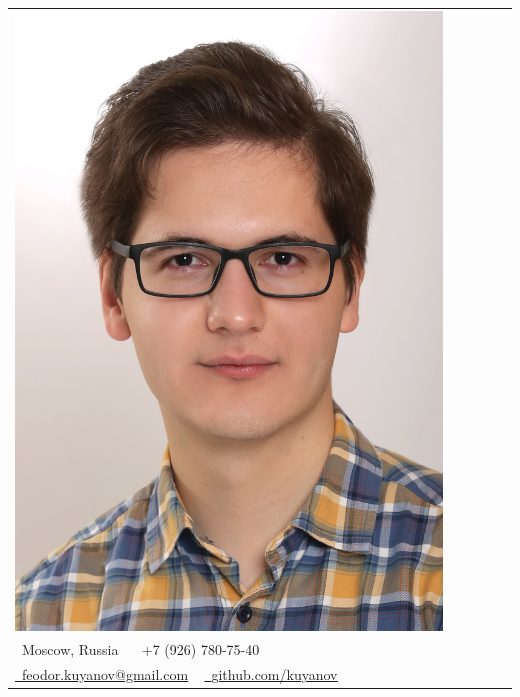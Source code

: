 \documentclass[letterpaper,11pt]{article}
\begin{document}
\begin{tabular}{l c}
	\begin{minipage}{0.3\textwidth}
		\includegraphics[width=0.9\textwidth]{25.11.23-2.jpg}
	\end{minipage} &
	\begin{minipage}{0.7\textwidth}
		\begin{center}
			\vspace{15pt}
			{\Huge \scshape Fedor Kuyanov} \\ 
			\vspace{15pt}
			\small \raisebox{-0.1\height}\faHome\ Moscow, Russia ~ 
			\small \raisebox{-0.1\height}\faPhone\ +7 (926) 780-75-40 ~ \\
			\vspace{5pt}
			\href{mailto:feodor.kuyanov@gmail.com}{\raisebox{-0.2\height}\faEnvelope\  \underline{feodor.kuyanov@gmail.com}} ~ 
			\href{https://github.com/kuyanov}{\raisebox{-0.2\height}\faGithub\ \underline{github.com/kuyanov}}
		\end{center}
		

\end{minipage}
\end{tabular}
\end{document}
